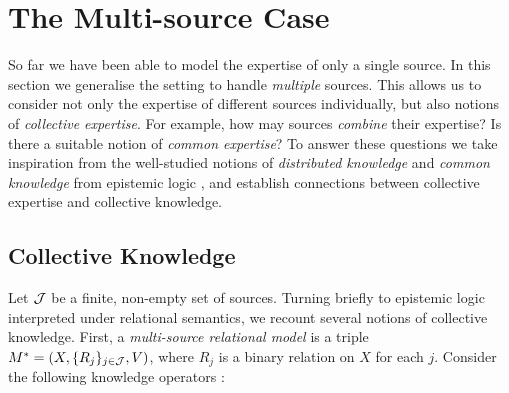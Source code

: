 \section{The Multi-source Case}
\label{sec_multisource}

So far we have been able to model the expertise of only a single
source. In this section we generalise the setting to handle \emph{multiple}
sources. This allows us to consider not only the expertise of different
sources individually, but also notions of \emph{collective expertise}. For
example, how may sources \emph{combine} their expertise? Is there a suitable
notion of
\emph{common expertise}? To answer these questions we take inspiration from the
well-studied notions of \emph{distributed knowledge} and \emph{common
knowledge} from epistemic logic \citep{fagin2003reasoning}, and
establish connections between collective expertise and collective knowledge.

\subsection{Collective Knowledge}

Let $\mathcal{J}$ be a finite, non-empty set of sources. Turning briefly to epistemic
logic interpreted under relational semantics, we recount several notions of
collective knowledge. First, a \emph{multi-source relational model} is a triple
$M^* = (X, \{R_j\}_{j \in \mathcal{J}}, V)$, where $R_j$ is a binary relation on $X$ for
each $j$. Consider the following knowledge operators \citep{fagin2003reasoning}:

